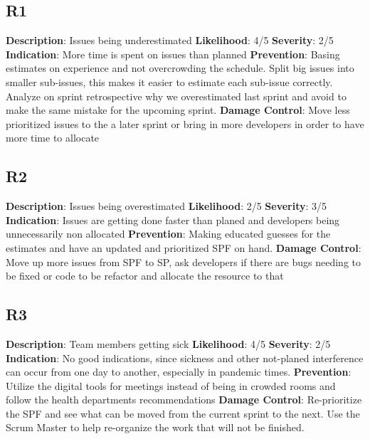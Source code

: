 \documentclass{article}
\begin{document}
\subsection{R1}
\textbf{Description}: Issues being underestimated \newline
\textbf{Likelihood}: 4/5\newline
\textbf{Severity}: 2/5\newline
\textbf{Indication}: More time is spent on issues than planned \newline
\textbf{Prevention}: Basing estimates on experience and not overcrowding the schedule. Split big issues into smaller sub-issues, this makes it easier to estimate each sub-issue correctly. Analyze on sprint retrospective why we overestimated last sprint and avoid to make the same mistake for the upcoming sprint. \newline
\textbf{Damage Control}: Move less prioritized issues to the a later sprint or bring in more developers in order to have more time to allocate \newline

\subsection{R2}
\textbf{Description}: Issues being overestimated \newline
\textbf{Likelihood}: 2/5\newline
\textbf{Severity}: 3/5\newline
\textbf{Indication}: Issues are getting done faster than planed and developers being unnecessarily non allocated \newline
\textbf{Prevention}: Making educated guesses for the estimates and have an updated and prioritized SPF on hand. \newline
\textbf{Damage Control}: Move up more issues from SPF to SP, ask developers if there are bugs needing to be fixed or code to be refactor and allocate the resource to that \newline

\subsection{R3}
\textbf{Description}: Team members getting sick \newline
\textbf{Likelihood}: 4/5\newline
\textbf{Severity}: 2/5\newline
\textbf{Indication}: No good indications, since sickness and other not-planed interference can occur from one day to another, especially in pandemic times. \newline
\textbf{Prevention}: Utilize the digital tools for meetings instead of being in crowded rooms and follow the health departments recommendations \newline
\textbf{Damage Control}: Re-prioritize the SPF and see what can be moved from the current sprint to the next. Use the Scrum Master to help re-organize the work that will not be finished. \newline
\end{document}
